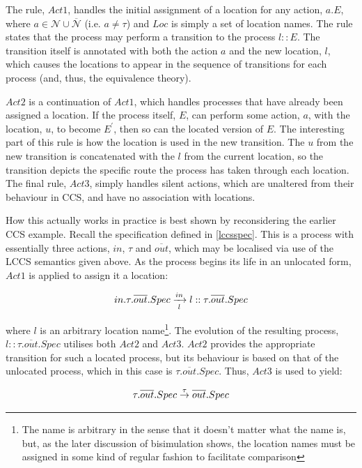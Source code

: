 The rule, $Act1$, handles the initial assignment of a location for any
action, $a.E$, where $a \in \mathcal{N} \cup \overline{\mathcal{N}}$
(i.e. $a \ne \tau$) and $Loc$ is simply a set of location names.  The
rule states that the process may perform a transition to the process
$l::E$.  The transition itself is annotated with both the action $a$ and
the new location, $l$, which causes the locations to appear in the
sequence of transitions for each process (and, thus, the equivalence
theory).

$Act2$ is a continuation of $Act1$, which handles processes that have
already been assigned a location.  If the process itself, $E$, can
perform some action, $a$, with the location, $u$, to become $E^\prime$,
then so can the located version of $E$.  The interesting part of this
rule is how the location is used in the new transition.  The $u$ from
the new transition is concatenated with the $l$ from the current
location, so the transition depicts the specific route the process has
taken through each location.  The final rule, $Act3$, simply handles
silent actions, which are unaltered from their behaviour in CCS, and
have no association with locations.

How this actually works in practice is best shown by reconsidering the
earlier CCS example.  Recall the specification defined in
\ref{lccsspec}.  This is a process with essentially three actions, $in$,
$\tau$ and $\overline{out}$, which may be localised via use of the LCCS
semantics given above.  As the process begins its life in an unlocated
form, $Act1$ is applied to assign it a location:

\begin{equation}
in.\tau.\overline{out}.Spec \xrightarrow[l]{in}
l::\tau.\overline{out}.Spec
\end{equation}

\noindent where $l$ is an arbitrary location name\footnote{The name is
arbitrary in the sense that it doesn't matter what the name is, but, as
the later discussion of bisimulation shows, the location names must be
assigned in some kind of regular fashion to facilitate comparison}.  The
evolution of the resulting process, $l::\tau.\overline{out}.Spec$
utilises both $Act2$ and $Act3$.  $Act2$ provides the appropriate
transition for such a located process, but its behaviour is based on
that of the unlocated process, which in this case is
$\tau.\overline{out}.Spec$.  Thus, $Act3$ is used to yield:

\begin{equation}
\tau.\overline{out}.Spec \stackrel{\tau}{\rightarrow} \overline{out}.Spec
\end{equation}

